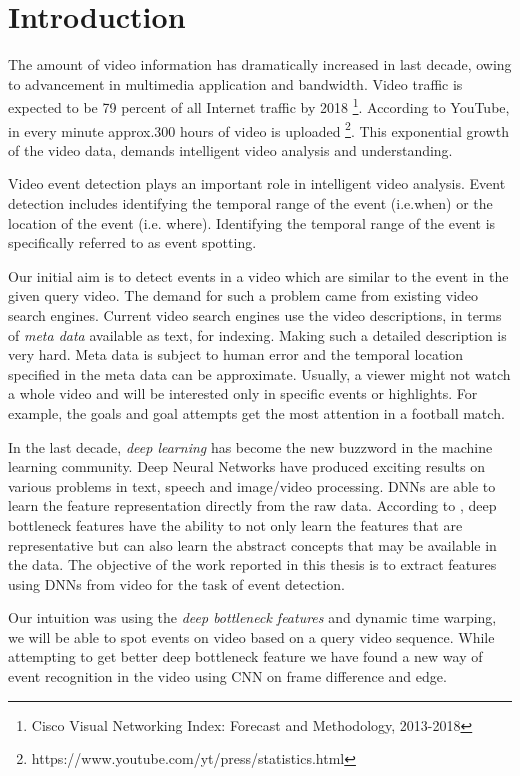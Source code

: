 \chapter{Introduction}
\label{chap:intro}

The amount of video information has dramatically increased in last decade, owing to advancement in multimedia application and bandwidth. Video traffic is expected to be  79 percent of all Internet traffic by 2018 \footnote{Cisco Visual Networking Index: Forecast and Methodology, 2013-2018}. According to YouTube, in every minute approx.300 hours of video is uploaded \footnote{https://www.youtube.com/yt/press/statistics.html}. This exponential growth of the video data, demands intelligent video analysis and understanding.

Video event detection plays an important role in intelligent video analysis. Event detection includes identifying the temporal range of the event (i.e.when) or the location of the event (i.e. where). Identifying the temporal range of the event is specifically referred to as event spotting. 

Our initial aim is to detect events in a video which are similar to the event in the given query video. The demand for such a problem came from existing video search engines. Current video search engines use the video descriptions, in terms of  \textit{meta data} available as text, for indexing.  Making such a detailed description is very hard. Meta data is subject to human error and the temporal location specified in the meta data can be approximate. Usually, a viewer might not watch a whole video and will be interested only in specific events or highlights. For example, the goals and goal attempts get the most attention in a football match.

In the last decade, \textit{deep learning} has become the new buzzword in the machine learning community. Deep Neural Networks have produced exciting results on various problems in text, speech and image/video processing. DNNs are able to learn the feature representation directly from the raw data. According to \citet{hinton2009deep}, deep bottleneck features have the ability to not only learn the features that are representative but can also learn the abstract concepts that may be available in the data.   The objective of the work reported in this thesis is to extract features using DNNs from video for the task of event detection.

Our intuition was using the \textit{deep bottleneck features} and dynamic time warping, we will be able to spot events on video based on a query video sequence. While attempting  to get better deep bottleneck feature we have found a new  way of event recognition in the video using CNN on frame difference and edge.

